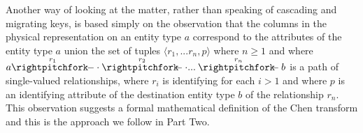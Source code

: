 \documentclass[10pt,a4paper]{article}
\begin{document}
Another way of looking at the matter, rather than speaking of cascading and migrating keys, is based simply on the observation that the columns in the physical representation on an entity type $a$ correspond to the attributes of the entity type $a$ union the set of tuples $\langle r_1,...r_n, p \rangle$ where $n \geq 1$ and where
$\overset{r_1}{a \rightpitchfork \hspace{-0.35em} -  \cdot} \overset{r_2}{\rightpitchfork \hspace{-0.35em} -} \cdot ... \overset{r_n}{\rightpitchfork \hspace{-0.35em} -} b$ is a path of single-valued relationships, where 
$r_i$ is identifying for each $i > 1$ and where $p$ is an identifying attribute of the destination entity type $b$ of the
relationship $r_n$. This observation suggests a formal mathematical definition of the Chen transform and this is the approach we follow in Part Two. \\



\
 

	 
\end{document}
